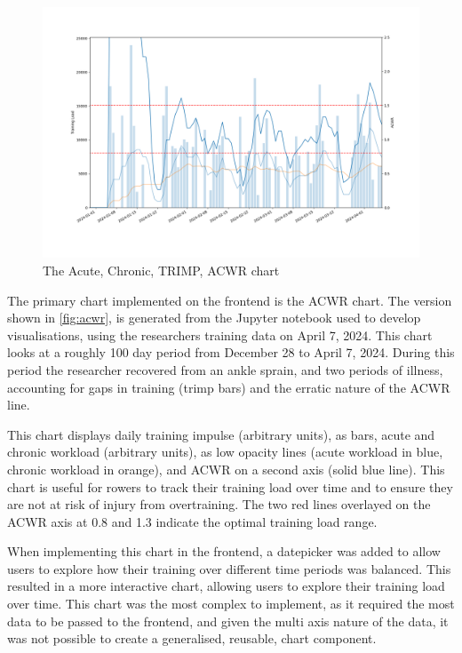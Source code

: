 \begin{figure}[htbp]
  \centering
  \includegraphics[width=\linewidth]{figures/acwr.png}
  \captionsetup{justification=centering}
  \caption[ACWR Chart]{\label{fig:acwr}The Acute, Chronic, TRIMP, ACWR chart}
\end{figure}
The primary chart implemented on the frontend is the ACWR chart. The version shown in \autoref{fig:acwr}, is generated from the Jupyter notebook used to develop visualisations, using the researchers training data on April 7, 2024. This chart looks at a roughly 100 day period from December 28 to April 7, 2024. During this period the researcher recovered from an ankle sprain, and two periods of illness, accounting for gaps in training (trimp bars) and the erratic nature of the ACWR line.

This chart displays daily training impulse (arbitrary units), as bars, acute and chronic workload (arbitrary units), as low opacity lines (acute workload in blue, chronic workload in orange), and ACWR on a second axis (solid blue line). This chart is useful for rowers to track their training load over time and to ensure they are not at risk of injury from overtraining. The two red lines overlayed on the ACWR axis at 0.8 and 1.3 indicate the optimal training load range. 

When implementing this chart in the frontend, a datepicker was added to allow users to explore how their training over different time periods was balanced. This resulted in a more interactive chart, allowing users to explore their training load over time. This chart was the most complex to implement, as it required the most data to be passed to the frontend, and given the multi axis nature of the data, it was not possible to create a generalised, reusable, chart component.


